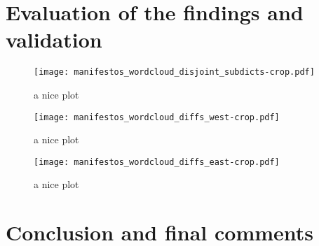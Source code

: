 \documentclass[a4paper]{scrreprt}
\begin{document}
\chapter{Evaluation of the findings and validation}
\begin{figure}
    \centering
    \texttt{[image: manifestos\_wordcloud\_disjoint\_subdicts-crop.pdf]}
    \caption{a nice plot}
\end{figure}
\begin{figure}
    \centering
    \begin{minipage}{.5\textwidth}
        \centering
        \texttt{[image: manifestos\_wordcloud\_diffs\_west-crop.pdf]}
        \caption{a nice plot}
    \end{minipage}%
    \begin{minipage}{.5\textwidth}
        \centering
        \texttt{[image: manifestos\_wordcloud\_diffs\_east-crop.pdf]}
        \caption{a nice plot}
    \end{minipage}
\end{figure}
\chapter{Conclusion and final comments}


\end{document}
